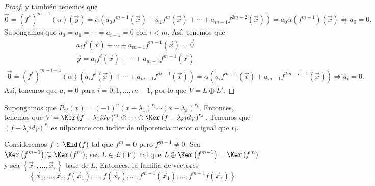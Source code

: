 \begin{proof}
y también tenemos que
\[ \vec{0} = \left(f^{*}\right)^{m -1}\left(\alpha \right)\left(\vec{y}\right) = \alpha \left(a_{0}f^{m -1}\left(\vec{x}\right) + a_{1}f^{m}\left(\vec{x}\right) + \cdots + a_{m -1}f^{2m-2}\left(\vec{x}\right)\right) = a_{0}\alpha\left(f^{m -1}\right)\left(\vec{x}\right) \Rightarrow a_{0} = 0.\]
Supongamos que $\displaystyle a_{0}= a_{1} = \cdots = a_{i-1} = 0 $ con $\displaystyle i < m $. Así, tenemos que
\[
\begin{split}
 & a_{i}f^{i}\left(\vec{x}\right) + \cdots + a_{m -1}f^{m -1}\left(\vec{x}\right) = \vec{0} \\
& \vec{y} = a_{i}f^{i}\left(\vec{x}\right) + \cdots + a_{m -1}f^{m -1}\left(\vec{x}\right) 
\end{split}
\]
\[
\begin{split}
	\vec{0} = \left(f^{*}\right)^{m -i-1}\left(\alpha \right)\left(a_{i}f^{i}\left(\vec{x}\right) + \cdots + a_{m -1}f^{m -1}\left(\vec{x}\right)\right) = \alpha\left(a_{i}f^{m -1}\left(\vec{x}\right)+a_{m -1}f^{2m -i-1}\left(\vec{x}\right)\right) \Rightarrow a_{i} = 0.
\end{split}
\]
Así, tenemos que $\displaystyle a_{i} = 0 $ para $\displaystyle i = 0, 1, \ldots, m -1 $, por lo que $\displaystyle V = L \oplus L'$.
\end{proof}
\begin{observation}
\normalfont Supongamos que $\displaystyle P_{cf}\left(x\right) = \left(-1\right)^{n}\left(x -\lambda_{1}\right)^{r_{1}} \cdots \left(x - \lambda_{k}\right)^{r_{k}} $. Entonces, tenemos que $\displaystyle V = \Ker\left(f -\lambda_{1}id _{V}\right)^{r_{1}} \oplus \cdots \oplus \Ker\left(f - \lambda_{k}id _{V}\right)^{r_{k}} $. Tenemos que $\displaystyle \left(f -\lambda_{i}id _{V}\right)^{r_{i}} $ es nilpotente con índice de nilpotencia menor o igual que $\displaystyle r_{i} $.
\end{observation}
Consideremos $\displaystyle f \in \End\left(f\right) $ tal que $\displaystyle f^{m} = 0 $ pero $\displaystyle f^{ m -1}\neq 0 $. Sea $\displaystyle \Ker\left(f^{m -1}\right)\subsetneq \Ker\left(f^{m}\right) $, sea $\displaystyle L \in \mathcal{L}\left(V\right) $ tal que $\displaystyle L \oplus \Ker\left(f^{m -1}\right) = \Ker\left(f^{m}\right) $ y sea $\displaystyle \left\{ \vec{x}_{1}, \ldots, \vec{x}_{r}\right\}  $ base de $\displaystyle L $. Entonces, la familia de vectores
\[ \left\{ \vec{x}_{1}, \ldots, \vec{x}_{r}, f\left(\vec{x}_{1}\right), \ldots, f\left(\vec{x}_{r}\right), \ldots, f^{m-1}\left(\vec{x}_{1}\right), \ldots, f^{m -1}f\left(\vec{x}_{r}\right)\right\}  \]
